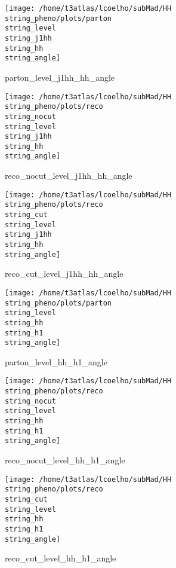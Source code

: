 \documentclass[a4paper,onecolumn,final,11pt]{article}
\begin{document}
\begin{figure}[H] 
\centering 
\begin{minipage}{.32\textwidth} 
        \centering 
        \hspace{0cm} 
        \texttt{[image: /home/t3atlas/lcoelho/subMad/HH\\string\_pheno/plots/parton\\string\_level\\string\_j1hh\\string\_hh\\string\_angle]} 
        \caption{parton_level_j1hh_hh_angle} 
\end{minipage} 
\hfill 
\begin{minipage}{.32\textwidth} 
        \centering 
        \hspace{0cm} 
    \texttt{[image: /home/t3atlas/lcoelho/subMad/HH\\string\_pheno/plots/reco\\string\_nocut\\string\_level\\string\_j1hh\\string\_hh\\string\_angle]} 
        \caption{reco_nocut_level_j1hh_hh_angle} 
\end{minipage} 
\hfill 
\begin{minipage}{.32\textwidth} 
        \centering 
        \hspace{0cm} 
    \texttt{[image: /home/t3atlas/lcoelho/subMad/HH\\string\_pheno/plots/reco\\string\_cut\\string\_level\\string\_j1hh\\string\_hh\\string\_angle]} 
        \caption{reco_cut_level_j1hh_hh_angle} 
\end{minipage} 
\end{figure} 
 
\begin{figure}[H] 
\centering 
\begin{minipage}{.32\textwidth} 
        \centering 
        \hspace{0cm} 
        \texttt{[image: /home/t3atlas/lcoelho/subMad/HH\\string\_pheno/plots/parton\\string\_level\\string\_hh\\string\_h1\\string\_angle]} 
        \caption{parton_level_hh_h1_angle} 
\end{minipage} 
\hfill 
\begin{minipage}{.32\textwidth} 
        \centering 
        \hspace{0cm} 
    \texttt{[image: /home/t3atlas/lcoelho/subMad/HH\\string\_pheno/plots/reco\\string\_nocut\\string\_level\\string\_hh\\string\_h1\\string\_angle]} 
        \caption{reco_nocut_level_hh_h1_angle} 
\end{minipage} 
\hfill 
\begin{minipage}{.32\textwidth} 
        \centering 
        \hspace{0cm} 
    \texttt{[image: /home/t3atlas/lcoelho/subMad/HH\\string\_pheno/plots/reco\\string\_cut\\string\_level\\string\_hh\\string\_h1\\string\_angle]} 
        \caption{reco_cut_level_hh_h1_angle} 
\end{minipage} 
\end{figure} 
 
\end{document}
